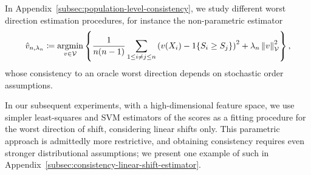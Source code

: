 In Appendix~\ref{subsec:population-level-consistency}, we study different worst direction estimation procedures,  for instance the non-parametric estimator
\begin{align}
\label{eqn:penalized-linear-loss-finite-sample-worst-direction-estimator}
\hat{v}_{n,  \lambda_n} \coloneqq \mathop{\rm argmin}_{v \in \mathcal{V}} \left\{ \frac{1}{n(n-1)} \sum_{1\le i \neq j \le n} \left( v(X_i) - 1\!\left\{S_i \ge S_j\right\} \right)^2  + \lambda_n \left\|{v}\right\|_{\mathcal{V}}^2 \right\},
\end{align}
whose consistency to an oracle worst direction depends on stochastic order assumptions. 

In our subsequent experiments, with a high-dimensional feature space, we use
simpler least-squares and SVM estimators of the scores as a fitting
procedure for the worst direction of shift, considering linear shifts only.
This parametric approach is admittedly more restrictive, and obtaining
consistency requires even stronger distributional assumptions; we present one example of such in Appendix~\ref{subsec:consistency-linear-shift-estimator}.
